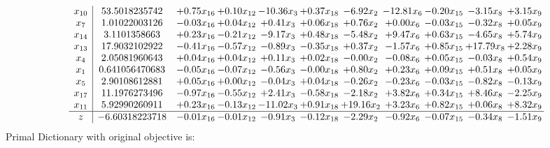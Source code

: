 \documentclass[9pt]{article}
\begin{document}
\[\begin{array}{c| c c@{\hskip 2pt} c@{\hskip 2pt} c@{\hskip 2pt} c@{\hskip 2pt} c@{\hskip 2pt} c@{\hskip 2pt} c@{\hskip 2pt} c@{\hskip 2pt} c@{\hskip 2pt} }
 x_{10}   &  53.5018235742 & +  0.75 x_{16} & +  0.10 x_{12} & -10.36 x_{3} & +  0.37 x_{18} & -6.92 x_{2} & -12.81 x_{6} & -0.20 x_{15} & -3.15 x_{8} & +  3.15 x_{9}\\
 x_{7}   &  1.01022003126 & -0.03 x_{16} & +  0.04 x_{12} & +  0.41 x_{3} & +  0.06 x_{18} & +  0.76 x_{2} & +  0.00 x_{6} & -0.03 x_{15} & -0.32 x_{8} & +  0.05 x_{9}\\
 x_{14}   &  3.1101358663 & +  0.23 x_{16} & -0.21 x_{12} & -9.17 x_{3} & +  0.48 x_{18} & -5.48 x_{2} & +  9.47 x_{6} & +  0.63 x_{15} & -4.65 x_{8} & +  5.74 x_{9}\\
 x_{13}   &  17.9032102922 & -0.41 x_{16} & -0.57 x_{12} & -0.89 x_{3} & -0.35 x_{18} & +  0.37 x_{2} & -1.57 x_{6} & +  0.85 x_{15} & + 17.79 x_{8} & +  2.28 x_{9}\\
 x_{4}   &  2.05081960643 & +  0.04 x_{16} & +  0.04 x_{12} & +  0.11 x_{3} & +  0.02 x_{18} & -0.00 x_{2} & -0.08 x_{6} & +  0.05 x_{15} & -0.03 x_{8} & +  0.54 x_{9}\\
 x_{1}   &  0.641056470683 & -0.05 x_{16} & -0.07 x_{12} & -0.56 x_{3} & -0.00 x_{18} & +  0.80 x_{2} & +  0.23 x_{6} & +  0.09 x_{15} & +  0.51 x_{8} & +  0.05 x_{9}\\
 x_{5}   &  2.90108612881 & +  0.05 x_{16} & +  0.00 x_{12} & -0.04 x_{3} & +  0.04 x_{18} & -0.26 x_{2} & -0.23 x_{6} & -0.03 x_{15} & -0.82 x_{8} & -0.13 x_{9}\\
 x_{17}   &  11.1976273496 & -0.97 x_{16} & -0.55 x_{12} & +  2.41 x_{3} & -0.58 x_{18} & -2.18 x_{2} & +  3.82 x_{6} & +  0.34 x_{15} & +  8.46 x_{8} & -2.25 x_{9}\\
 x_{11}   &  5.92990260911 & +  0.23 x_{16} & -0.13 x_{12} & -11.02 x_{3} & +  0.91 x_{18} & + 19.16 x_{2} & +  3.23 x_{6} & +  0.82 x_{15} & +  0.06 x_{8} & +  8.32 x_{9}\\
\hline
z    &  -6.60318223718 & -0.01 x_{16} & -0.01 x_{12} & -0.91 x_{3} & -0.12 x_{18} & -2.29 x_{2} & -0.92 x_{6} & -0.07 x_{15} & -0.34 x_{8} & -1.51 x_{9}\\
\end{array}\]
Primal Dictionary with original objective is:
\end{document}
